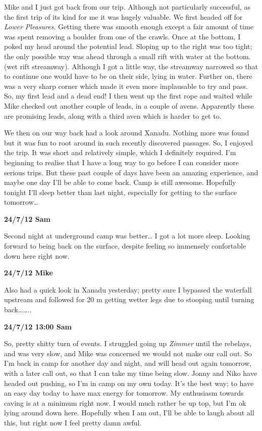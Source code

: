 Mike and I just got back from our trip. Although not particularly
successful, as the first trip of its kind for me it was hugely valuable.
We first headed off for \emph{Lower Pleasures}. Getting there was smooth
enough except a fair amount of time was spent removing a boulder from
one of the crawls. Once at the bottom, I poked my head around the
potential lead. Sloping up to the right was too tight; the only possible
way was ahead through a small rift with water at the bottom. (wet rift
streamway). Although I got a little way, the streamway narrowed so that
to continue one would have to be on their side, lying in water. Further
on, there was a very sharp corner which made it even more implausable to
try and pass. So, my first lead and a dead end! I then went up the first
rope and waited while Mike checked out another couple of leads, in a
couple of avens. Apparently these are promising leads, along with a
third aven which is harder to get to.

We then on our way back had a look around Xanadu. Nothing more was found
but it was fun to root around in such recently discovered passages. So,
I enjoyed the trip. It was short and relatively simple, which I
definitely required. I'm beginning to realise that I have a long way to
go before I can consider more serious trips. But these past couple of
days have been an amazing experience, and maybe one day I'll be able to
come back. Camp is still awesome. Hopefully tonight I'll sleep better
than last night, especially for getting to the surface tomorrow\ldots{}

\textbf{24/7/12 Sam}

Second night at underground camp was better\ldots{} I got a lot more
sleep. Looking forward to being back on the surface, despite feeling so
immensely confortable down here right now.

\textbf{24/7/12 Mike}

Also had a quick look in Xanadu yesterday; pretty sure I bypassed the
waterfall upstream and followed for 20 m getting wetter legs due to
stooping until turning back\ldots{}\ldots{}..

\textbf{24/7/12 13:00 Sam}

So, pretty shitty turn of events. I struggled going up \emph{Zimmer}
until the rebelays, and was very slow, and Mike was concerned we would
not make our call out. So I'm back in camp for another day and night,
and will head out again tomorrow, with a later call out, so that I can
take my time being slow. Jonny and Niko have headed out pushing, so I'm
in camp on my own today. It's the best way; to have an easy day today to
have max energy for tomorrow. My enthusiasm towards caving is at a
minimum right now. I would much rather be up top, but I'm ok lying
around down here. Hopefully when I am out, I'll be able to laugh about
all this, but right now I feel pretty damn awful.

